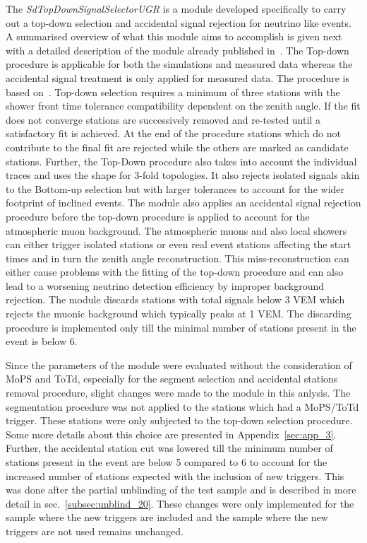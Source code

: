 The \textit{SdTopDownSignalSelectorUGR} is a module developed specifically to carry out a top-down selection and accidental signal rejection for neutrino like events. A summarised overview of what this module aims to accomplish is given next with a detailed description of the module already published in~\cite{gap_top_down_module}. The Top-down procedure is applicable for both the simulations and measured data whereas the accidental signal treatment is only applied for measured data. The procedure is based on~\cite{gap_top_down_proc}. Top-down selection requires a minimum of three stations with the shower front time tolerance compatibility dependent on the zenith angle. If the fit does not converge stations are successively removed and re-tested until a satisfactory fit is achieved. At the end of the procedure stations which do not contribute to the final fit are rejected while the others are marked as candidate stations. Further, the Top-Down procedure also takes into account the individual traces and uses the shape for 3-fold topologies. It also rejects isolated signals akin to the Bottom-up selection but with larger tolerances to account for the wider footprint of inclined events. The module also applies an accidental signal rejection procedure before the top-down procedure is applied to account for the atmospheric muon background. The atmospheric muons and also local showers can either trigger isolated stations or even real event stations affecting the start times and in turn the zenith angle reconstruction. This miss-reconstruction can either cause problems with the fitting of the top-down procedure and can also lead to a worsening neutrino detection efficiency by improper background rejection. The module discards stations with total signals below 3 VEM which rejects the muonic background which typically peaks at 1 VEM. The discarding procedure is implemented only till the minimal number of stations present in the event is below 6.

Since the parameters of the module were evaluated without the consideration of MoPS and ToTd, especially for the segment selection and accidental stations removal procedure, slight changes were made to the module in this anlysis. The segmentation procedure was not applied to the stations which had a MoPS/ToTd trigger. These stations were only subjected to the top-down selection procedure. Some more details about this choice are presented in Appendix~\ref{sec:app_3}. Further, the accidental station cut was lowered till the minimum number of stations present in the event are below 5 compared to 6 to account for the increased number of stations expected with the inclusion of new triggers. This was done after the partial unblinding of the test sample and is described in more detail in sec.~\ref{subsec:unblind_20}. These changes were only implemented for the sample where the new triggers are included and the sample where the new triggers are not used remains unchanged. 

